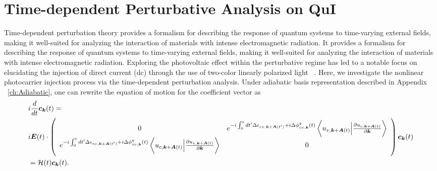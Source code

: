 \section{Time-dependent Perturbative Analysis on QuI \label{sec:deriveperturbation}}
Time-dependent perturbation theory provides a formalism for describing the response of quantum systems to time-varying external fields, making it well-suited for analyzing the interaction of materials with intense electromagnetic radiation. It provides a formalism for describing the response of quantum systems to time-varying external fields, making it well-suited for analyzing the interaction of materials with intense electromagnetic radiation. 
Exploring the photovoltaic effect within the perturbative regime has led to a notable focus on elucidating the injection of direct current (dc) through the use of two-color linearly polarized light ~\cite{PhysRevLett.74.3596,PhysRevLett.76.1703,PhysRevLett.78.306,Sun2010,PhysRevB.100.075202,HeideBoolakeeEcksteinHommelhoff+2021+3701+3707,PhysRevLett.123.067402}. 
Here, we investigate the nonlinear photocarrier injection process via the time-dependent perturbation analysis.
Under adiabatic basis representation described in Appendix ~\ref{ch:Adiabatic}, one can rewrite the equation of motion for the coefficient vector as
\begin{align}
&i\frac{d}{dt} \boldsymbol c_{\boldsymbol k}(t) = 
 \nonumber \\
& i\boldsymbol E(t)\cdot \left(
    \begin{array}{cc}
      0 & 
      e^{-i\int^t_0dt' \Delta \epsilon_{cv,\boldsymbol k+ \boldsymbol A(t')}+i \Delta \phi^g_{cv,\boldsymbol k}(t)} 
  \left \langle u_{v,\boldsymbol k+\boldsymbol A(t)}\Big |\frac{\partial u_{c,\boldsymbol k+\boldsymbol A(t)}}{\partial \boldsymbol k} \right \rangle \\
      e^{-i\int^t_0dt' \Delta \epsilon_{vc,\boldsymbol k+ \boldsymbol A(t')}+i \Delta \phi^g_{vc,\boldsymbol k}(t)} 
  \left \langle u_{c,\boldsymbol k+\boldsymbol A(t)}\Big |\frac{\partial u_{v,\boldsymbol k+\boldsymbol A(t)}}{\partial \boldsymbol k} \right \rangle &
      0
    \end{array}
    \right) \boldsymbol c_{\boldsymbol k}(t) \nonumber \\
&= \mathcal{H}(t) \boldsymbol c_{\boldsymbol k}(t)
.
\label{eq:tdse-ad-basis}
\end{align}


